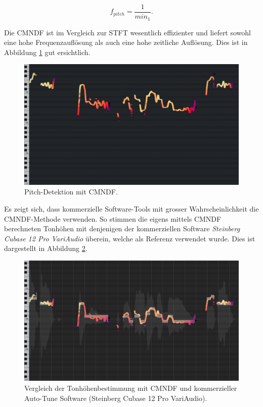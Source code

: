\begin{equation}
    f_{pitch}
    =
    \frac{1}{min_1}.
\end{equation}


Die CMNDF ist im Vergleich zur STFT wesentlich effizienter und liefert sowohl eine hohe Frequenzauflösung als auch eine hohe zeitliche Auflösung.
Dies ist in Abbildung \ref{autotune:fig:pitchDetektionCMNDF} gut ersichtlich.

\begin{figure}
	\centering
	\includegraphics[width=\textwidth]{papers/autotune/images/Pianoscale_Example_Detuned_CMNDF.png}
	\caption{Pitch-Detektion mit CMNDF.}
    \label{autotune:fig:pitchDetektionCMNDF}
\end{figure}


Es zeigt sich, dass kommerzielle Software-Tools mit grosser Wahrscheinlichkeit die CMNDF-Methode verwenden.
So stimmen die eigens mittels CMNDF berechneten Tonhöhen mit denjenigen der kommerziellen Software \textit{Steinberg Cubase 12 Pro VariAudio} überein,
welche als Referenz verwendet wurde. Dies ist dargestellt in Abbildung \ref{autotune:fig:pitchDetektionCMNDFReference}.

\begin{figure}
	\centering
	\includegraphics[width=\textwidth]{papers/autotune/images/Pianoscale_Example_Detuned_CMNDF_Reference.png}
	\caption{Vergleich der Tonhöhenbestimmung mit CMNDF und kommerzieller Auto-Tune Software (Steinberg Cubase 12 Pro VariAudio).}
    \label{autotune:fig:pitchDetektionCMNDFReference}
\end{figure}
